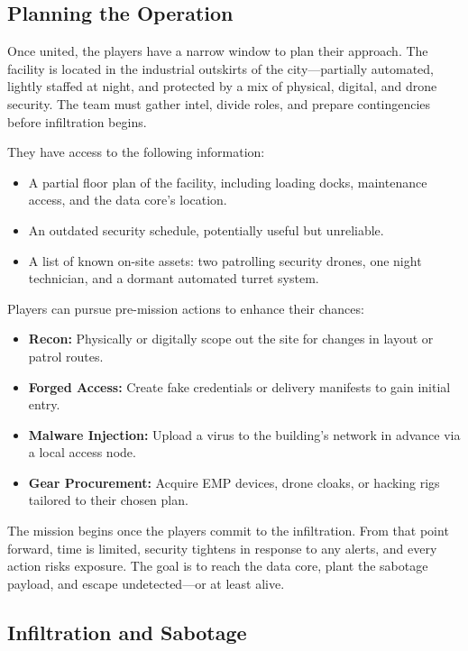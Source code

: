 \documentclass[nodeprecatedcode,bg=print]{dndbook}
\begin{document}
\begin{multicols}{2}
\subsection*{Planning the Operation}

Once united, the players have a narrow window to plan their approach. The facility is located in the industrial outskirts of the city—partially automated, lightly staffed at night, and protected by a mix of physical, digital, and drone security. The team must gather intel, divide roles, and prepare contingencies before infiltration begins.

They have access to the following information:
\begin{itemize}
    \item A partial floor plan of the facility, including loading docks, maintenance access, and the data core's location.
    \item An outdated security schedule, potentially useful but unreliable.
    \item A list of known on-site assets: two patrolling security drones, one night technician, and a dormant automated turret system.
\end{itemize}

Players can pursue pre-mission actions to enhance their chances:
\begin{itemize}
    \item \textbf{Recon:} Physically or digitally scope out the site for changes in layout or patrol routes.
    \item \textbf{Forged Access:} Create fake credentials or delivery manifests to gain initial entry.
    \item \textbf{Malware Injection:} Upload a virus to the building's network in advance via a local access node.
    \item \textbf{Gear Procurement:} Acquire EMP devices, drone cloaks, or hacking rigs tailored to their chosen plan.
\end{itemize}

The mission begins once the players commit to the infiltration. From that point forward, time is limited, security tightens in response to any alerts, and every action risks exposure. The goal is to reach the data core, plant the sabotage payload, and escape undetected—or at least alive.


\subsection*{Infiltration and Sabotage}


\end{multicols}
\end{document}
